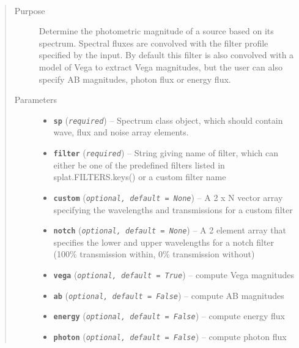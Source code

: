 \documentclass[letterpaper,10pt,english]{sphinxmanual}
\begin{document}
\begin{fulllineitems}
\label{api:splat.filterMag}~\begin{quote}\begin{description}
\item[{Purpose}] \leavevmode
Determine the photometric magnitude of a source based on its
spectrum. Spectral fluxes are convolved with the filter profile specified by
the  input.  By default this filter is also
convolved with a model of Vega to extract Vega magnitudes,
but the user can also specify AB magnitudes, photon flux or
energy flux.

\item[{Parameters}] \leavevmode\begin{itemize}
\item {} 
\textbf{\texttt{sp}} (\emph{\texttt{required}}) -- Spectrum class object, which should contain wave, flux and
noise array elements.

\item {} 
\textbf{\texttt{filter}} (\emph{\texttt{required}}) -- String giving name of filter, which can either be one of the predefined filters listed in splat.FILTERS.keys() or a custom filter name

\item {} 
\textbf{\texttt{custom}} (\emph{\texttt{optional, default = None}}) -- A 2 x N vector array specifying the wavelengths and transmissions for a custom filter

\item {} 
\textbf{\texttt{notch}} (\emph{\texttt{optional, default = None}}) -- A 2 element array that specifies the lower and upper wavelengths for a notch filter (100\% transmission within, 0\% transmission without)

\item {} 
\textbf{\texttt{vega}} (\emph{\texttt{optional, default = True}}) -- compute Vega magnitudes

\item {} 
\textbf{\texttt{ab}} (\emph{\texttt{optional, default = False}}) -- compute AB magnitudes

\item {} 
\textbf{\texttt{energy}} (\emph{\texttt{optional, default = False}}) -- compute energy flux

\item {} 
\textbf{\texttt{photon}} (\emph{\texttt{optional, default = False}}) -- compute photon flux


\end{itemize}
\end{description}
\end{quote}
\end{fulllineitems}
\end{document}
